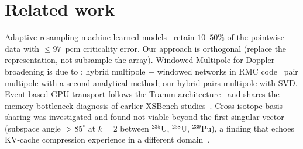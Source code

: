 \section{Related work}
\label{sec:related}

Adaptive resampling machine-learned
models~\cite{ml_resampling_2025,ml_fullcore_2026} retain
$10$--$50\%$ of the pointwise data with $\leq 97$~pcm
criticality error. Our approach is orthogonal (replace the
representation, not subsample the array). Windowed Multipole
for Doppler broadening is due to
\cite{josey2015wmp,forget2014wmp}; hybrid multipole + windowed
networks in RMC code~\cite{hybrid_wn_2021} pair multipole with
a second analytical method; our hybrid pairs multipole with
SVD. Event-based GPU transport follows the Tramm
architecture~\cite{tramm2024} and shares the memory-bottleneck
diagnosis of earlier XSBench studies~\cite{tramm2014xsbench}.
Cross-isotope basis sharing was investigated and found not
viable beyond the first singular vector (subspace angle
$>\!85^\circ$ at $k=2$ between $^{235}$U, $^{238}$U,
$^{239}$Pu), a finding that echoes KV-cache compression
experience in a different domain~\cite{minicache2024}.


